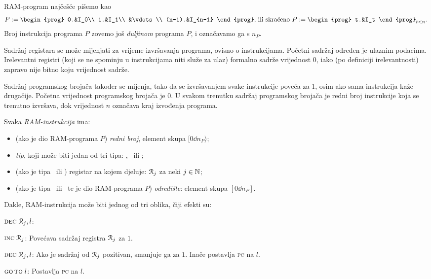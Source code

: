 RAM-program najčešće pišemo kao \begin{equation}
P:=\begin{prog}
    0.&I_0\\
    1.&I_1\\
    &\vdots\\
    (n-1).&I_{n-1}
    \end{prog}\text{, ili skraćeno } P:=\begin{prog}
    t.&I_t
    \end{prog}_{t<n}\text.
\end{equation}
Broj instrukcija programa $P$ zovemo još \emph{duljinom} programa $P$, i označavamo ga s $n_P$.

Sadržaj registara se može mijenjati za vrijeme izvršavanja programa, ovisno o instrukcijama. Početni sadržaj određen je ulaznim podacima. Irelevantni registri (koji se ne spominju u instrukcijama niti služe za ulaz) formalno sadrže vrijednost $0$, iako (po definiciji irelevantnosti) zapravo nije bitno koju vrijednost sadrže.

Sadržaj programskog brojača također se mijenja, tako da se iz\-vr\-ša\-va\-njem svake instrukcije poveća za $1$, osim ako sama instrukcija kaže drugačije. Početna vrijednost programskog brojača je $0$. U svakom trenutku sadržaj programskog brojača je redni broj instrukcije koja se trenutno izvršava, dok vrijednost $n$ označava kraj izvođenja programa.

\begin{definicija}[{name=[RAM-instrukcija]}]
Svaka \emph{RAM-instrukcija} ima:
\begin{itemize}
    \item (ako je dio RAM-programa $P$) \emph{redni broj}, element skupa $[0\dd n_P\rangle$;
    \item \emph{tip}, koji može biti jedan od tri tipa: \inc, \dec\ ili \goto;
    \item (ako je tipa \inc\ ili \dec) registar na kojem djeluje: $\mathcal R_{j}$ za neki $j\in{\mathbb N}$;
    \item (ako je tipa \dec\ ili \goto\ te je dio RAM-programa $P$) \emph{odredište}: element skupa $[0\dd n_P]$.
    \qedhere
\end{itemize}
\end{definicija}

Dakle, RAM-instrukcija može biti jednog od tri oblika, čiji efekti su:

\begin{labeling}{$\textsc{dec}\;\mathcal R_{j},l$:}
    \item[$\textsc{inc}\;\mathcal R_{j}$:] Povećava sadržaj registra $\mathcal R_{j}$ za $1$.
    \item[$\textsc{dec}\;\mathcal R_{j},l$:] Ako je sadržaj od $\mathcal R_{j}$ pozitivan, smanjuje ga za $1$. Inače postavlja \textsc{pc} na $l$.
    \item[$\textsc{go\,to}\;l$:] Postavlja \textsc{pc} na $l$.
\end{labeling}

